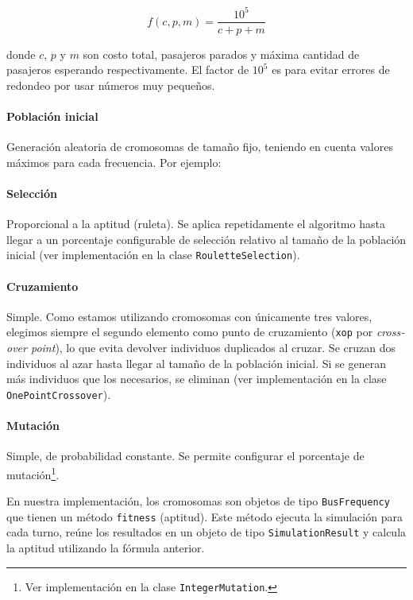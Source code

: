 \documentclass{conaiisi}
\begin{document}
\begin{multicols}{2}
\[ f(c, p, m) = \frac{10^5}{c + p + m} \]

donde $c$, $p$ y $m$ son costo total, pasajeros parados y máxima cantidad de pasajeros esperando respectivamente.
El factor de $10^5$ es para evitar errores de redondeo por usar números muy pequeños.


\paragraph{Población inicial} Generación aleatoria de cromosomas de tamaño fijo, teniendo en cuenta valores máximos para cada frecuencia.
Por ejemplo:



\paragraph{Selección} Proporcional a la aptitud (ruleta). Se aplica repetidamente el algoritmo hasta llegar a un porcentaje configurable de selección relativo al tamaño de la población inicial (ver implementación en la clase \texttt{RouletteSelection}).

\paragraph{Cruzamiento} Simple.
Como estamos utilizando cromosomas con únicamente tres valores, elegimos siempre el segundo elemento como punto de cruzamiento (\texttt{xop} por \textit{\foreignlanguage{english}{crossover point}}), lo que evita devolver individuos duplicados al cruzar.
Se cruzan dos individuos al azar hasta llegar al tamaño de la población inicial.
Si se generan más individuos que los necesarios, se eliminan (ver implementación en la clase \texttt{OnePointCrossover}).

\paragraph{Mutación} Simple, de probabilidad constante. Se permite configurar el porcentaje de mutación\footnote{Ver implementación en la clase \texttt{IntegerMutation}.}.

En nuestra implementación, los cromosomas son objetos de tipo \texttt{BusFrequency} que tienen un método \texttt{fitness} (aptitud).
Este método ejecuta la simulación para cada turno, reúne los resultados en un objeto de tipo \texttt{SimulationResult} y calcula la aptitud utilizando la fórmula anterior.


\end{multicols}
\end{document}
